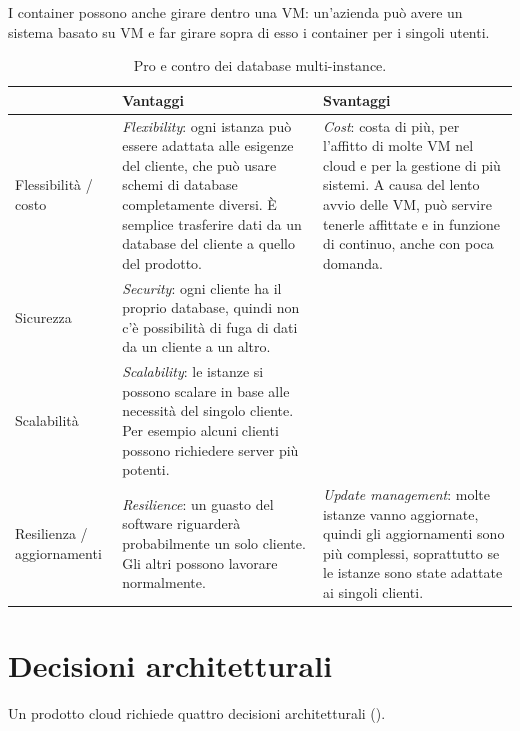 I container possono anche girare dentro una VM: un'azienda può avere un sistema basato su VM e far girare sopra di
esso i container per i singoli utenti.

\begin{table}[ht]
\centering
\small
\caption{Pro e contro dei database multi-instance.}
\label{tab:cloud-multiistanza}
\begin{tabularx}{\linewidth}{>{\raggedright\arraybackslash}p{2.6cm}XX}
\toprule
& Vantaggi & Svantaggi \\
\midrule
Flessibilità / costo & \emph{Flexibility}: ogni istanza può essere adattata alle esigenze del cliente, che può
  usare schemi di database completamente diversi. È semplice trasferire dati da un database del cliente a quello del
  prodotto. & \emph{Cost}: costa di più, per l'affitto di molte VM nel cloud e per la gestione di più sistemi. A
  causa del lento avvio delle VM, può servire tenerle affittate e in funzione di continuo, anche con poca domanda. \\
Sicurezza & \emph{Security}: ogni cliente ha il proprio database, quindi non c'è possibilità di fuga di dati da un
  cliente a un altro. & \\
Scalabilità & \emph{Scalability}: le istanze si possono scalare in base alle necessità del singolo cliente. Per esempio
  alcuni clienti possono richiedere server più potenti. & \\
Resilienza / aggiornamenti & \emph{Resilience}: un guasto del software riguarderà probabilmente un solo cliente. Gli
  altri possono lavorare normalmente. & \emph{Update management}: molte istanze vanno aggiornate, quindi gli aggiornamenti
  sono più complessi, soprattutto se le istanze sono state adattate ai singoli clienti. \\
\bottomrule
\end{tabularx}
\end{table}

\section{Decisioni architetturali}
\label{sec:cloud-decisioni}

Un prodotto cloud richiede quattro decisioni architetturali ().

